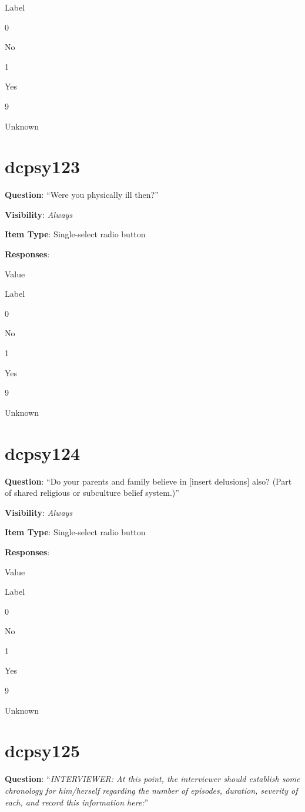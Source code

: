 \documentclass[]{book}
\begin{document}
Label

0

No

1

Yes

9

Unknown

\hypertarget{dcpsy123}{%
\section{dcpsy123}\label{dcpsy123}}

\textbf{Question}: ``Were you physically ill then?''

\textbf{Visibility}: \emph{Always}

\textbf{Item Type}: Single-select radio button

\textbf{Responses}:

Value

Label

0

No

1

Yes

9

Unknown

\hypertarget{dcpsy124}{%
\section{dcpsy124}\label{dcpsy124}}

\textbf{Question}: ``Do your parents and family believe in {[}insert delusions{]} also? (Part of shared religious or subculture belief system.)''

\textbf{Visibility}: \emph{Always}

\textbf{Item Type}: Single-select radio button

\textbf{Responses}:

Value

Label

0

No

1

Yes

9

Unknown

\hypertarget{dcpsy125}{%
\section{dcpsy125}\label{dcpsy125}}

\textbf{Question}: ``\emph{INTERVIEWER: At this point, the interviewer should establish some chronology for him/herself regarding the number of episodes, duration, severity of each, and record this information here:}''
\end{document}
